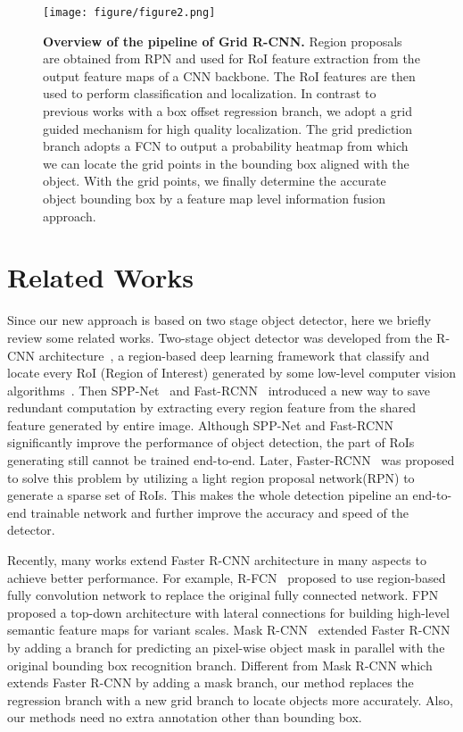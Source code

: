 \documentclass[10pt,twocolumn,letterpaper]{article}
\begin{document}
\begin{figure*}[ht]
\centering
\texttt{[image: figure/figure2.png]} 
\caption{\textbf{Overview of the pipeline of Grid R-CNN.} Region proposals are obtained from RPN and used for RoI feature extraction from the output feature maps of a CNN backbone. The RoI features are then used to perform classification and localization. In contrast to previous works with a box offset regression branch, we adopt a grid guided mechanism for high quality localization. The grid prediction branch adopts a FCN to output a probability heatmap from which we can locate the grid points in the bounding box aligned with the object. With the grid points, we finally determine the accurate object bounding box by a feature map level information fusion approach.}
\label{fig:pipeline}
\end{figure*}

\section{Related Works}
Since our new approach is based on two stage object detector, here we briefly review some related works. Two-stage object detector was developed from the R-CNN architecture~\cite{girshick2014rich}, a region-based deep learning framework that classify and locate every RoI (Region of Interest) generated by some low-level computer vision algorithms~\cite{Uijlings2013Selective,zitnick2014edge}. Then SPP-Net~\cite{he2014spatial} and Fast-RCNN~\cite{girshick2015fast} introduced a new way to save redundant computation by extracting every region feature from the shared feature generated by entire image. Although SPP-Net and Fast-RCNN significantly improve the performance of object detection, the part of RoIs generating still cannot be trained end-to-end. Later, Faster-RCNN~\cite{ren2015faster} was proposed to solve this problem by utilizing a light region proposal network(RPN) to generate a sparse set of RoIs. This makes the whole detection pipeline an end-to-end trainable network and further improve the accuracy and speed of the detector. 

Recently, many works extend Faster R-CNN architecture in many aspects to achieve better performance.
For example, R-FCN~\cite{dai2016r} proposed to use region-based fully convolution network to replace the original fully connected network. FPN~\cite{lin2017feature} proposed a top-down architecture with lateral connections for building high-level semantic feature maps for variant scales. Mask R-CNN~\cite{he2017mask} extended Faster R-CNN by adding a branch for predicting an pixel-wise object mask in parallel with the original bounding box recognition branch. Different from Mask R-CNN which extends Faster R-CNN by adding a mask branch, our method replaces the regression branch with a new grid branch to locate objects more accurately. Also, our methods need no extra annotation other than bounding box.
\end{document}
